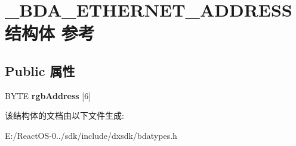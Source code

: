 \hypertarget{struct___b_d_a___e_t_h_e_r_n_e_t___a_d_d_r_e_s_s}{}\section{\+\_\+\+B\+D\+A\+\_\+\+E\+T\+H\+E\+R\+N\+E\+T\+\_\+\+A\+D\+D\+R\+E\+S\+S结构体 参考}
\label{struct___b_d_a___e_t_h_e_r_n_e_t___a_d_d_r_e_s_s}
\subsection*{Public 属性}
\begin{DoxyCompactItemize}
\item 
\mbox{\label{struct___b_d_a___e_t_h_e_r_n_e_t___a_d_d_r_e_s_s_a89262f32c470c998206330fe621d22a8}} 
B\+Y\+TE {\bfseries rgb\+Address} \mbox{[}6\mbox{]}
\end{DoxyCompactItemize}


该结构体的文档由以下文件生成\+:\begin{DoxyCompactItemize}
\item 
E\+:/\+React\+O\+S-\/0../sdk/include/dxsdk/bdatypes.\+h\end{DoxyCompactItemize}
